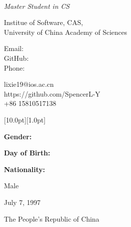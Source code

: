 \documentclass[12pt,a4paper,utf8]{report}
\newcommand{\namefont}[1]{{\normalfont\bfseries\Huge{#1}}}
\newcommand{\myname}{Xie Li (李勰)}
\newcommand{\mydegree}{Master Student in CS}
\newcommand{\mywork}{}
\begin{document}
\begin{minipage}[t]{8cm}
    \begin{center}
        \vspace{0.0cm}\namefont{\myname}\\[0.1cm]
    \end{center}
\end{minipage}
\begin{minipage}[t]{8cm}
    \vspace{0.0cm}
    {\em{\mydegree}}\par
    {\em{\mywork}}\par
\end{minipage}

\begin{minipage}[t]{8cm}
    \vspace{0.4cm}
    Institue of Software, CAS, \\
    University of China Academy of Sciences\\
    
\end{minipage}
\begin{minipage}[t]{1.5cm}
    \vspace{0.4cm}
    Email: \\
    GitHub: \\
    Phone: \\
\end{minipage}
\begin{minipage}[t]{8cm}
    \vspace{0.4cm}
    lixie19@ios.ac.cn \\
    https://github.com/SpencerL-Y \\
    +86 15810517138 \\
\end{minipage}
\vspace{-0.2cm}

\begin{minipage}[t]{16cm}
    \colorbox{subtitlecolor}{\raisebox{0pt}[10.0pt][1.0pt]{
        \textcolor{white}{\textsf{}}}}
\end{minipage}\par
\vspace{0.2cm}
    \begin{minipage}[t]{4cm}
        \qquad \textbf{Gender:}\par
        \qquad \textbf{Day of Birth:}\par
        \qquad \textbf{Nationality:}\par
    \end{minipage}
    \begin{minipage}[t]{12cm}
        Male \par
        July 7, 1997 \par
        The People's Republic of China \par
    \end{minipage}\par
\vspace{0.4cm}
\end{document}
